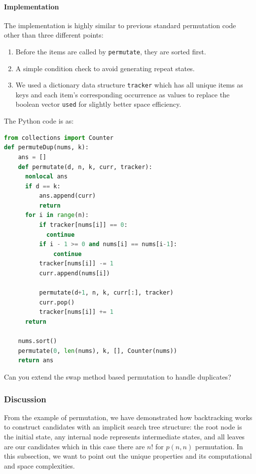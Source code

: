\documentclass[../main.tex]{subfiles}
\begin{document}
\paragraph{Implementation} The implementation is highly similar to previous standard permutation code other than three different points: 
\begin{enumerate}
\item Before the items are called by \texttt{permutate}, they are sorted first.
\item  A simple condition check to avoid generating repeat states.
    \item We used a dictionary data structure \texttt{tracker} which has all unique items as keys and each item's corresponding occurrence as values to replace the boolean vector \texttt{used} for slightly better space efficiency.
\end{enumerate}
The Python code is as:
\begin{lstlisting}[language=Python]
from collections import Counter
def permuteDup(nums, k):
    ans = []
    def permutate(d, n, k, curr, tracker):  
      nonlocal ans 
      if d == k:
          ans.append(curr)
          return
      for i in range(n):
          if tracker[nums[i]] == 0:
            continue
          if i - 1 >= 0 and nums[i] == nums[i-1]:
              continue
          tracker[nums[i]] -= 1
          curr.append(nums[i])

          permutate(d+1, n, k, curr[:], tracker)
          curr.pop()
          tracker[nums[i]] += 1
      return
    
    nums.sort()
    permutate(0, len(nums), k, [], Counter(nums))
    return ans
\end{lstlisting}

\begin{bclogo}[couleur = blue!30, arrondi=0.1,logo=\bccrayon,ombre=true]{Can you extend the swap method based permutation to handle duplicates?} 
\end{bclogo}

\subsubsection{Discussion}
From the example of permutation, we have demonstrated how backtracking works to construct candidates with an implicit search tree structure: the root node is the initial state, any internal node represents intermediate states, and all leaves are our candidates which in this case there are $n!$ for $p(n, n)$ permutation. In this subsection, we want to point out the unique properties and its computational and space complexities.
\end{document}

